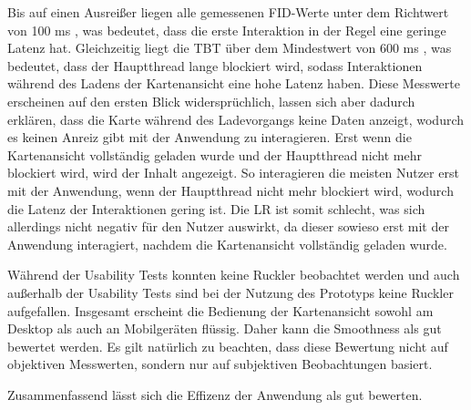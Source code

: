 Bis auf einen Ausreißer liegen alle gemessenen \ac{FID}-Werte unter dem Richtwert von 100 ms \cite{FID}, was bedeutet, dass die erste Interaktion in der Regel eine geringe Latenz hat. Gleichzeitig liegt die \ac{TBT} über dem Mindestwert von 600 ms \cite{TBT}, was bedeutet, dass der Hauptthread lange blockiert wird, sodass Interaktionen während des Ladens der Kartenansicht eine hohe Latenz haben. Diese Messwerte erscheinen auf den ersten Blick widersprüchlich, lassen sich aber dadurch erklären, dass die Karte während des Ladevorgangs keine Daten anzeigt, wodurch es keinen Anreiz gibt mit der Anwendung zu interagieren. Erst wenn die Kartenansicht vollständig geladen wurde und der Hauptthread nicht mehr blockiert wird, wird der Inhalt angezeigt. So interagieren die meisten Nutzer erst mit der Anwendung, wenn der Hauptthread nicht mehr blockiert wird, wodurch die Latenz der Interaktionen gering ist. Die \ac{LR} ist somit schlecht, was sich allerdings nicht negativ für den Nutzer auswirkt, da dieser sowieso erst mit der Anwendung interagiert, nachdem die Kartenansicht vollständig geladen wurde.

Während der Usability Tests konnten keine Ruckler beobachtet werden und auch außerhalb der Usability Tests sind bei der Nutzung des Prototyps keine Ruckler aufgefallen. Insgesamt erscheint die Bedienung der Kartenansicht sowohl am Desktop als auch an Mobilgeräten flüssig. Daher kann die Smoothness als gut bewertet werden. Es gilt natürlich zu beachten, dass diese Bewertung nicht auf objektiven Messwerten, sondern nur auf subjektiven Beobachtungen basiert.

Zusammenfassend lässt sich die Effizenz der Anwendung als gut bewerten.


